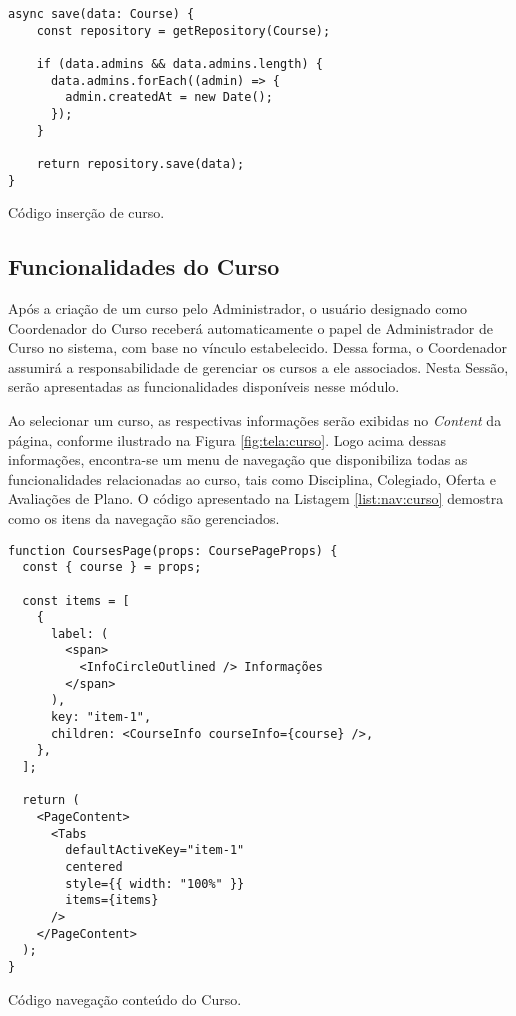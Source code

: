 \begin{listing}[h]
    \begin{verbatim}
async save(data: Course) {
    const repository = getRepository(Course);

    if (data.admins && data.admins.length) {
      data.admins.forEach((admin) => {
        admin.createdAt = new Date();
      });
    }

    return repository.save(data);
}
    \end{verbatim}
    \caption{Código inserção de curso.}
    \label{list:insert-curso}
\end{listing}



\subsection{Funcionalidades do Curso} \label{subsec:constr:curso}


Após a criação de um curso pelo Administrador, o usuário designado como Coordenador do Curso receberá automaticamente o papel de Administrador de Curso no sistema, com base no vínculo estabelecido. Dessa forma, o Coordenador assumirá a responsabilidade de gerenciar os cursos a ele associados. Nesta Sessão, serão apresentadas as funcionalidades disponíveis nesse módulo.

Ao selecionar um curso, as respectivas informações serão exibidas no \textit{Content} da página, conforme ilustrado na Figura \ref{fig:tela:curso}. Logo acima dessas informações, encontra-se um menu de navegação que disponibiliza todas as funcionalidades relacionadas ao curso, tais como Disciplina, Colegiado, Oferta e Avaliações de Plano. O código apresentado na Listagem \ref{list:nav:curso} demostra como os itens da navegação são gerenciados.


\begin{listing}[h]
    \begin{verbatim}
function CoursesPage(props: CoursePageProps) {
  const { course } = props;

  const items = [
    {
      label: (
        <span>
          <InfoCircleOutlined /> Informações
        </span>
      ),
      key: "item-1",
      children: <CourseInfo courseInfo={course} />,
    },
  ];

  return (
    <PageContent>
      <Tabs
        defaultActiveKey="item-1"
        centered
        style={{ width: "100%" }}
        items={items}
      />
    </PageContent>
  );
}
    \end{verbatim}
    \caption{Código navegação conteúdo do Curso.}
    \label{list:nav:curso}
\end{listing}


